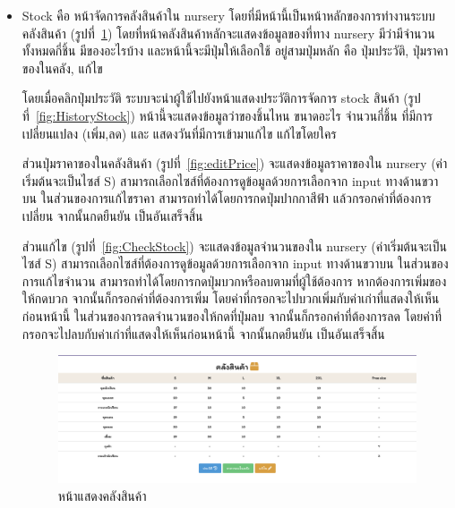 \begin{itemize}
  \item  Stock คือ หน้าจัดการคลังสินค้าใน nursery โดยที่มีหน้านี้เป็นหน้าหลักของการทำงานระบบคลังสินค้า (รูปที่~\ref{fig:Stock}) โดยที่หน้าคลังสินค้าหลักจะแสดงข้อมูลของที่ทาง nursery มีว่ามีจำนวนทั้งหมดกี่ชิ้น มีของอะไรบ้าง และหน้านี้จะมีปุ่มให้เลือกใช้
  อยู่สามปุ่มหลัก คือ ปุ่มประวัติ, ปุ่มราคาของในคลัง, แก้ไข 
  
  โดยเมื่อคลิกปุ่มประวัติ ระบบจะนำผู้ใช้ไปยังหน้าแสดงประวัติการจัดการ stock สินค้า (รูปที่~\ref{fig:HistoryStock}) หน้านี้จะแสดงข้อมูลว่าของชิ้นไหน ขนาดอะไร จำนวนกี่ชิ้น ที่มีการเปลี่ยนแปลง (เพิ่ม,ลด) และ แสดงวันที่มีการเข้ามาแก้ไข แก้ไขโดยใคร
  
  ส่วนปุ่มราคาของในคลังสินค้า (รูปที่~\ref{fig:editPrice}) จะแสดงข้อมูลราคาของใน nursery (ค่าเริ่มต้นจะเป็นไซส์ S) สามารถเลือกไซส์ที่ต้องการดูข้อมูลด้วยการเลือกจาก input ทางด้านขวาบน ในส่วนของการแก้ไขราคา สามารถทำได้โดยการกดปุ่มปากกาสีฟ้า แล้วกรอกค่าที่ต้องการเปลี่ยน
  จากนั้นกดยืนยัน เป็นอันเสร็จสิ้น
  
  ส่วนแก้ไข (รูปที่~\ref{fig:CheckStock}) จะแสดงข้อมูลจำนวนของใน nursery (ค่าเริ่มต้นจะเป็นไซส์ S) สามารถเลือกไซส์ที่ต้องการดูข้อมูลด้วยการเลือกจาก input ทางด้านขวาบน 
  ในส่วนของการแก้ไขจำนวน สามารถทำได้โดยการกดปุ่มบวกหรือลบตามที่ผู้ใช้ต้องการ หากต้องการเพิ่มของให้กดบวก จากนั้นก็กรอกค่าที่ต้องการเพิ่ม โดยค่าที่กรอกจะไปบวกเพิ่มกับค่าเก่าที่แสดงให้เห็นก่อนหน้านี้ ในส่วนของการลดจำนวนของให้กดที่ปุ่มลบ จากนั้นก็กรอกค่าที่ต้องการลด โดยค่าที่กรอกจะไปลบกับค่าเก่าที่แสดงให้เห็นก่อนหน้านี้ จากนั้นกดยืนยัน เป็นอันเสร็จสิ้น

  
    \begin{figure}
      \begin{center}
      \includegraphics[width=\linewidth]{images/Stock.png}
      \end{center}
      \caption[หน้าแสดงคลังสินค้า]{หน้าแสดงคลังสินค้า}
      \label{fig:Stock}
      \end{figure}
  

\end{itemize}
